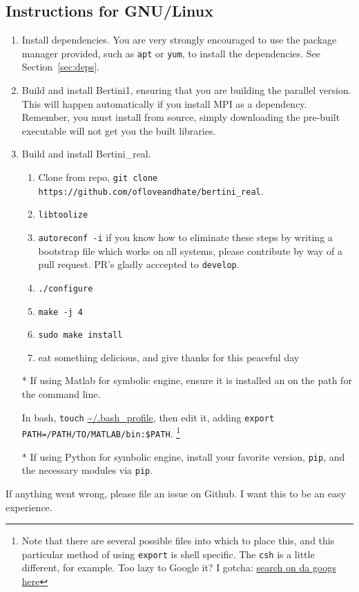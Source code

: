 
\subsection{Instructions for GNU/Linux}
\label{sec:install_linux}





\begin{enumerate}
\item Install dependencies. You are very strongly encouraged to use the package manager provided, such as {\tt apt} or {\tt yum}, to install the dependencies.  See Section~\ref{sec:deps}.
\item Build and install Bertini1, ensuring that you are building the parallel version.  This will happen automatically if you install MPI as a dependency.  Remember, you must install from source, simply downloading the pre-built executable will not get you the built libraries.
\item Build and install Bertini\_real.  
\begin{enumerate}
	\item Clone from repo, {\tt git clone https://github.com/ofloveandhate/bertini\_real}.  
	\item {\tt libtoolize}
	\item {\tt autoreconf -i} \quad if you know how to eliminate these steps by writing a bootstrap file which works on all systems, please contribute by way of a pull request.  PR's gladly acccepted to {\tt develop}.
	\item {\tt ./configure}
	\item {\tt make -j 4}
	\item {\tt sudo make install}
	\item eat something delicious, and give thanks for this peaceful day
\end{enumerate}
\item[*]
If using Matlab for symbolic engine, ensure it is installed an on the path for the command line.

In bash, {\tt touch} \url{~/.bash_profile}, then edit it, adding {\tt export PATH=/PATH/TO/MATLAB/bin:\$PATH}.%
\footnote{Note that there are several possible files into which to place this, and this particular method of using {\tt export} is shell specific.  The {\tt csh} is a little different, for example.  Too lazy to Google it?  I gotcha: \href{https://www.google.com/\#q=add+to+path+linux&*}{search on da googs here} } 

\item[*]
If using Python for symbolic engine, install your favorite version, {\tt pip}, and the necessary modules via {\tt pip}.

\end{enumerate}


If anything went wrong, please file an issue on Github.  I want this to be an easy experience.